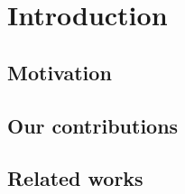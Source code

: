 \section{Introduction}

\subsection{Motivation}

\subsection{Our contributions}

\subsection{Related works}
